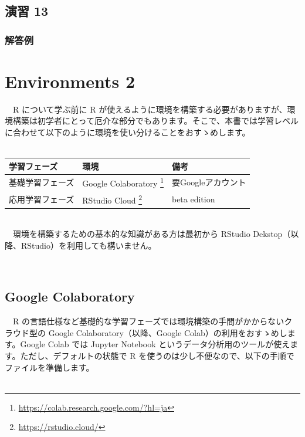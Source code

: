 \documentclass[
  12pt,
]{book}
\DeclareRobustCommand{\href}[2]{#2\footnote{\url{#1}}}
\begin{document}
\hypertarget{ux6f14ux7fd2-13-2}{%
\section*{演習 13}\label{ux6f14ux7fd2-13-2}}

\hypertarget{ux89e3ux7b54ux4f8b-12}{%
\subsection*{解答例}\label{ux89e3ux7b54ux4f8b-12}}

\hypertarget{environments-2}{%
\chapter{Environments 2}\label{environments-2}}

　R について学ぶ前に R が使えるように環境を構築する必要がありますが、環境構築は初学者にとって厄介な部分でもあります。そこで、本書では学習レベルに合わせて以下のように環境を使い分けることをおすゝめします。\\
　

\begin{longtable}[]{@{}lll@{}}
\toprule
学習フェーズ & 環境 & 備考 \\
\midrule
\endhead
基礎学習フェーズ & \href{https://colab.research.google.com/?hl=ja}{Google Colaboratory } & 要Googleアカウント \\
応用学習フェーズ & \href{https://rstudio.cloud/}{RStudio Cloud } & beta edition \\
\bottomrule
\end{longtable}

　\\
　環境を構築するための基本的な知識がある方は最初から RStudio Dekstop（以降、RStudio）を利用しても構いません。

　

\hypertarget{google-colaboratory}{%
\section{Google Colaboratory}\label{google-colaboratory}}

　R の言語仕様など基礎的な学習フェーズでは環境構築の手間がかからないクラウド型の Google Colaboratory（以降、Google Colab）の利用をおすゝめします。Google Colab では Jupyter Notebook というデータ分析用のツールが使えます。ただし、デフォルトの状態で R を使うのは少し不便なので、以下の手順でファイルを準備します。\\
　
\end{document}
